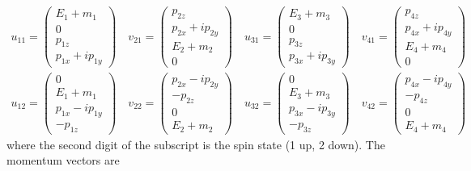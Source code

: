 \documentclass[12pt]{article}
\begin{document}
\begin{gather*}
u_{11}=\begin{pmatrix}E_1+m_1\\0\\p_{1z}\\p_{1x}+ip_{1y}\end{pmatrix}\quad
v_{21}=\begin{pmatrix}p_{2z}\\p_{2x}+ip_{2y}\\E_2+m_2\\0\end{pmatrix}\quad
u_{31}=\begin{pmatrix}E_3+m_3\\0\\p_{3z}\\p_{3x}+ip_{3y}\end{pmatrix}\quad
v_{41}=\begin{pmatrix}p_{4z}\\p_{4x}+ip_{4y}\\E_4+m_4\\0\end{pmatrix}\\
u_{12}=\begin{pmatrix}0\\E_1+m_1\\p_{1x}-ip_{1y}\\-p_{1z}\end{pmatrix}\quad
v_{22}=\begin{pmatrix}p_{2x}-ip_{2y}\\-p_{2z}\\0\\E_2+m_2\end{pmatrix}\quad
u_{32}=\begin{pmatrix}0\\E_3+m_3\\p_{3x}-ip_{3y}\\-p_{3z}\end{pmatrix}\quad
v_{42}=\begin{pmatrix}p_{4x}-ip_{4y}\\-p_{4z}\\0\\E_4+m_4\end{pmatrix}
\end{gather*}
where the second digit of the subscript is the spin state (1 up, 2 down).
The momentum vectors are
\end{document}
